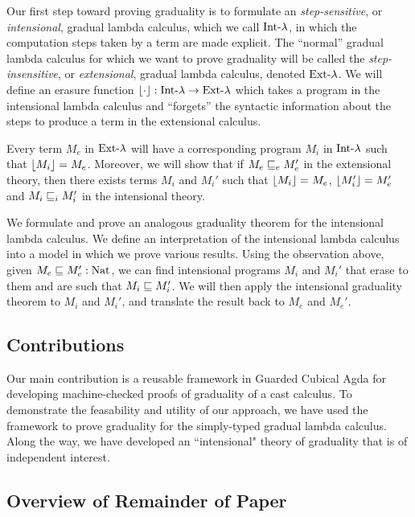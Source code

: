 Our first step toward proving graduality is to formulate an \emph{step-sensitive}, or \emph{intensional},
gradual lambda calculus, which we call $\text{Int-}\lambda$, in which the computation steps taken by a term are made explicit.
The ``normal'' gradual lambda calculus for which we want to prove graduality will be called the
\emph{step-insensitive}, or \emph{extensional}, gradual lambda calculus, denoted $\text{Ext-}\lambda$.
We will define an erasure function $\lfloor {\cdot} \rfloor : \text{Int-}\lambda \to \text{Ext-}\lambda$ which takes a program in the intensional lambda calculus
and ``forgets'' the syntactic information about the steps to produce a term in the extensional calculus.

Every term $M_e$ in $\text{Ext-}\lambda$ will have a corresponding program $M_i$ in $\text{Int-}\lambda$ such that
$\lfloor {M_i} \rfloor = M_e$. Moreover, we will show that if $M_e \sqsubseteq_e M_e'$ in the extensional theory,
then there exists terms $M_i$ and $M_i'$ such that $\lfloor {M_i} \rfloor=M_e$, $\lfloor {M_i'} \rfloor=M_e'$ and
$M_i \sqsubseteq_i M_i'$ in the intensional theory.

We formulate and prove an analogous graduality theorem for the intensional lambda calculus.
We define an interpretation of the intensional lambda calculus into a model in which we prove
various results. Using the observation above, given $M_e \sqsubseteq M_e' : \text{Nat}$, we can find
intensional programs $M_i$ and $M_i'$ that erase to them and are such that $M_i \sqsubseteq M_i'$.
We will then apply the intensional graduality theorem to $M_i$ and $M_i'$, and translate the result
back to $M_e$ and $M_e'$.

\subsection{Contributions}
Our main contribution is a reusable framework in Guarded Cubical Agda for developing machine-checked proofs
of graduality of a cast calculus.
To demonstrate the feasability and utility of our approach, we have used the framework to prove
graduality for the simply-typed gradual lambda calculus. Along the way, we have developed an ``intensional" theory
of graduality that is of independent interest.


\subsection{Overview of Remainder of Paper}

